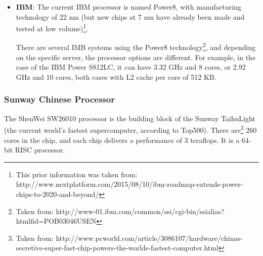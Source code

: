 \documentclass[paper=a4, fontsize=11pt]{scrartcl} %
\numberwithin{equation}{section} %
\numberwithin{figure}{section} %
\numberwithin{table}{section} %
\begin{document}
\begin{itemize}
\item \textbf{IBM}: The current IBM processor is named Power8, with manufacturing technology of 22 nm (but new chips at 7 nm have already been made and tested at low volume)\footnote{This prior information was taken from: http://www.nextplatform.com/2015/08/10/ibm-roadmap-extends-power-chips-to-2020-and-beyond/}.

There are several IMB systems using the Power8 technology\footnote{Taken from: http://www-01.ibm.com/common/ssi/cgi-bin/ssialias?htmlfid=POB03046USEN}, and depending on the specific server, the processor options are different. For example, in the case of the IBM Power S812LC, it can have 3.32 GHz and 8 cores, or 2.92 GHz and 10 cores, both cases with L2 cache per core of 512 KB.

\end{itemize}


\subsubsection{\small Sunway Chinese Processor}



\begin{comment}
\begin{center}
\begin{tabular}{ | c | c | c | c | c | }
\hline
\textbf{Processor} & \textbf{Manufacturing technology} & \textbf{Clock speed} & \textbf{Core count} & \textbf{Cache size} \\ \hline 
cell4 & cell5 & cell4 & cell5 & cell6 \\  \hline
cell4 & cell5 & cell7 & cell8 & cell9 \\ \hline
\end{tabular}
\end{center}
\end{comment}




The ShenWei SW26010 processor is the building block of the Sunway TaihuLight (the current world's fastest supercomputer, according to Top500). There are\footnote{Taken from: http://www.pcworld.com/article/3086107/hardware/chinas-secretive-super-fast-chip-powers-the-worlds-fastest-computer.html} 260 cores in the chip, and each chip delivers a performance of 3 teraflops. It is a 64-bit RISC processor.
\end{document}
